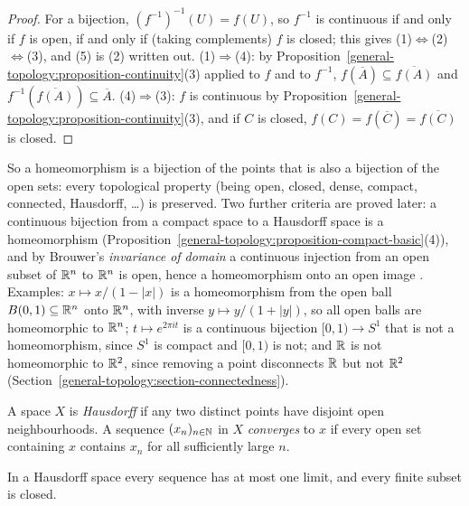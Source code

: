 \begin{proof}
For a bijection, $(f^{-1})^{-1}(U) = f(U)$, so $f^{-1}$ is continuous if and only if $f$ is open, if and only if (taking complements) $f$ is closed; this gives (1)$\Leftrightarrow$(2)$\Leftrightarrow$(3),
and (5) is (2) written out. (1)$\Rightarrow$(4): by Proposition~\ref{general-topology:proposition-continuity}(3) applied to $f$ and to $f^{-1}$, $f(\overline{A}) \subseteq \overline{f(A)}$ and
$f^{-1}(\overline{f(A)}) \subseteq \overline{A}$. (4)$\Rightarrow$(3): $f$ is continuous by Proposition~\ref{general-topology:proposition-continuity}(3), and if $C$ is closed, $f(C) = f(\overline{C}) =
\overline{f(C)}$ is closed.
\end{proof}

So a homeomorphism is a bijection of the points that is also a bijection of the open sets: every topological property (being open, closed, dense, compact, connected, Hausdorff, \ldots) is
preserved. Two further criteria are proved later: a continuous bijection from a compact space to a Hausdorff space is a homeomorphism
(Proposition~\ref{general-topology:proposition-compact-basic}(4)), and by Brouwer's \emph{invariance of domain} a continuous injection from an open subset of $\mathbb{R}^n$ to $\mathbb{R}^n$ is open, hence a
homeomorphism onto an open image \cite[Theorem 2B.3]{hatcher-at}. Examples: $x \mapsto x/(1 - |x|)$ is a homeomorphism from the open ball $B(0, 1) \subseteq \mathbb{R}^n$ onto $\mathbb{R}^n$, with inverse
$y \mapsto y/(1 + |y|)$, so all open balls are homeomorphic to $\mathbb{R}^n$; $t \mapsto e^{2\pi it}$ is a continuous bijection $[0, 1) \to S^1$ that is not a homeomorphism, since $S^1$ is compact and
$[0, 1)$ is not; and $\mathbb{R}$ is not homeomorphic to $\mathbb{R}^2$, since removing a point disconnects $\mathbb{R}$ but not $\mathbb{R}^2$ (Section~\ref{general-topology:section-connectedness}).

\begin{definition}\label{general-topology:definition-hausdorff}
A space $X$ is \emph{Hausdorff} if any two distinct points have disjoint open neighbourhoods. A sequence $(x_n)_{n \in \mathbb{N}}$ in $X$
\emph{converges} to $x$ if every open set containing $x$ contains $x_n$ for all sufficiently large $n$.
\end{definition}

\begin{lemma}\label{general-topology:lemma-hausdorff-limits}
In a Hausdorff space every sequence has at most one limit, and every finite subset is closed.
\end{lemma}

